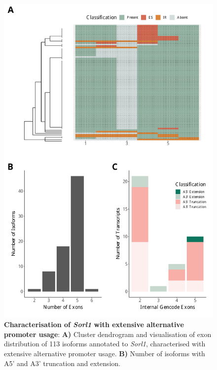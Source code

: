 \begin{figure}[htp]
	\begin{center}
		\includegraphics[page=8,trim={1cm 0cm 0 2cm},scale = 0.55]{Figures/TargetGenes.pdf}
	\end{center}
	\captionsetup{width=0.95\textwidth}
	\caption[Characterisation of \textit{Sorl1} with extensive alternative promoter usage]%
	{\textbf{Characterisation of \textit{Sorl1} with extensive alternative promoter usage}: \textbf{A)} Cluster dendrogram and visualisation of exon distribution of 113 isoforms annotated to \textit{Sorl1}, characterised with extensive alternative promoter usage. \textbf{B)} Number of isoforms with A5' and A3' truncation and extension.
	}   
	\label{fig:sorl1}
\end{figure}

